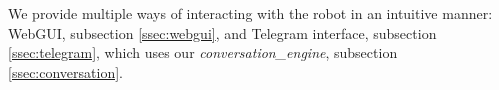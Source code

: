 We provide multiple ways of interacting with the robot in an intuitive manner:
WebGUI, subsection \ref{ssec:webgui}, and Telegram\texttrademark\hspace{0em} interface, subsection \ref{ssec:telegram}, which uses our \emph{conversation\_engine}, subsection \ref{ssec:conversation}.
